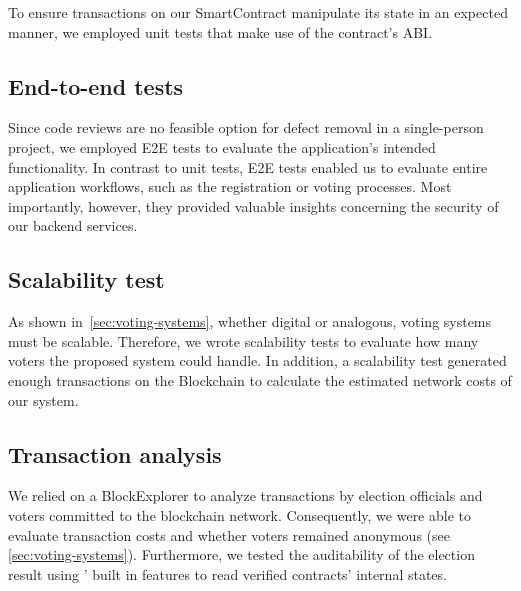 To ensure transactions on our \gls{SmartContract} manipulate its state in an expected manner, we employed unit tests that make use of the contract's \gls{ABI}.

\subsection{End-to-end tests}\label{subsec:end-to-end-tests}

Since code reviews are no feasible option for defect removal in a single-person project, we employed \gls{E2E} tests to evaluate the application’s intended functionality.
In contrast to unit tests, \gls{E2E} tests enabled us to evaluate entire application workflows, such as the registration or voting processes.
Most importantly, however, they provided valuable insights concerning the security of our backend services.

\subsection{Scalability test}\label{subsec:scalability-test}

As shown in~\cref{sec:voting-systems}, whether digital or analogous, voting systems must be scalable.
Therefore, we wrote scalability tests to evaluate how many voters the proposed system could handle.
In addition, a scalability test generated enough transactions on the \gls{Blockchain} to calculate the estimated network costs of our system.

\subsection{Transaction analysis}\label{subsec:transaction-analysis}

We relied on a \gls{BlockExplorer} to analyze transactions by election officials and voters committed to the blockchain network.
Consequently, we were able to evaluate transaction costs and whether voters remained anonymous (see \cref{sec:voting-systems}).
Furthermore, we tested the auditability of the election result using ' built in features to read verified contracts' internal states.